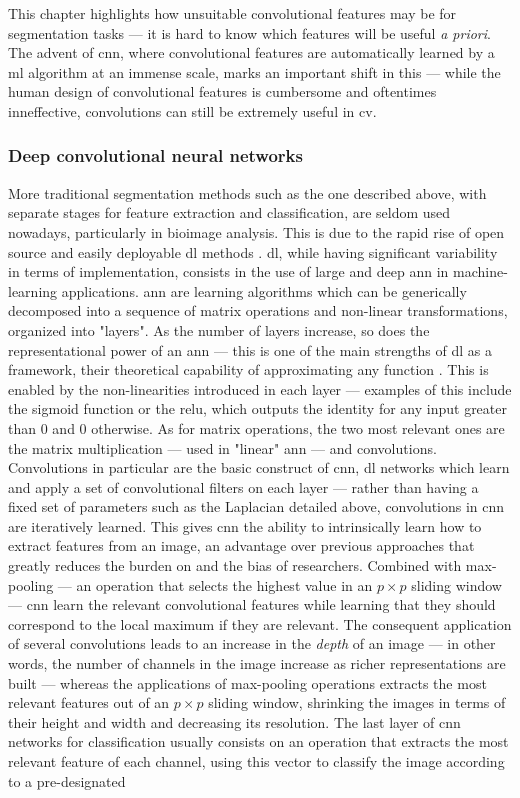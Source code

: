 This chapter highlights how unsuitable convolutional features may be for segmentation tasks --- it is hard to know which features will be useful \textit{a priori}. The advent of \ac{cnn}, where convolutional features are automatically learned by a \ac{ml} algorithm at an immense scale, marks an important shift in this --- while the human design of convolutional features is cumbersome and oftentimes inneffective, convolutions can still be extremely useful in \ac{cv}. 

\subsubsection{Deep convolutional neural networks}

More traditional segmentation methods such as the one described above, with separate stages for feature extraction and classification, are seldom used nowadays, particularly in bioimage analysis. This is due to the rapid rise of open source and easily deployable \ac{dl} methods \cite{Lucas2021-hc}. \Ac{dl}, while having significant variability in terms of implementation, consists in the use of large and deep \ac{ann} in machine-learning applications. \Ac{ann} are learning algorithms which can be generically decomposed into a sequence of matrix operations and non-linear transformations, organized into "layers". As the number of layers increase, so does the representational power of an \ac{ann} --- this is one of the main strengths of \ac{dl} as a framework, their theoretical capability of approximating any function \cite{Nielsen2015-wn}. This is enabled by the non-linearities introduced in each layer --- examples of this include the sigmoid function or the \ac{relu}, which outputs the identity for any input greater than $0$ and $0$ otherwise. As for matrix operations, the two most relevant ones are the matrix multiplication --- used in "linear" \ac{ann} --- and convolutions. Convolutions in particular are the basic construct of \ac{cnn}, \ac{dl} networks which learn and apply a set of convolutional filters on each layer --- rather than having a fixed set of parameters such as the Laplacian detailed above, convolutions in \ac{cnn} are iteratively learned. This gives \ac{cnn} the ability to intrinsically learn how to extract features from an image, an advantage over previous approaches that greatly reduces the burden on and the bias of researchers. Combined with max-pooling --- an operation that selects the highest value in an $p \times p$ sliding window --- \ac{cnn} learn the relevant convolutional features while learning that they should correspond to the local maximum if they are relevant. The consequent application of several convolutions leads to an increase in the \textit{depth} of an image --- in other words, the number of channels in the image increase as richer representations are built --- whereas the applications of max-pooling operations extracts the most relevant features out of an $p \times p$ sliding window, shrinking the images in terms of their height and width and decreasing its resolution. The last layer of \ac{cnn} networks for classification usually consists on an operation that extracts the most relevant feature of each channel, using this vector to classify the image according to a pre-designated 
